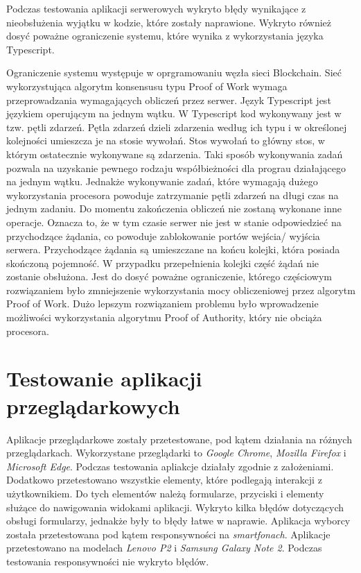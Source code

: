 \documentclass[a4paper,12pt]{book}
\begin{document}
Podczas testowania aplikacji serwerowych wykryto błędy wynikające z nieobsłużenia wyjątku w kodzie, które zostały naprawione. Wykryto również dosyć poważne ograniczenie systemu, które wynika z wykorzystania języka Typescript.

Ograniczenie systemu występuje w oprgramowaniu węzła sieci Blockchain. Sieć wykorzystująca algorytm konsensusu typu Proof of Work wymaga przeprowadzania wymagających obliczeń przez serwer. Język Typescript jest językiem operującym na jednym wątku. W Typescript kod wykonywany jest w tzw. pętli zdarzeń. Pętla zdarzeń dzieli zdarzenia według ich typu i w określonej kolejności umieszcza je na stosie wywołań. Stos wywołań to główny stos, w którym ostatecznie wykonywane są zdarzenia. Taki sposób wykonywania zadań pozwala na uzyskanie pewnego rodzaju współbieżności dla prograu działającego na jednym wątku. Jednakże wykonywanie zadań, które wymagają dużego wykorzystania procesora powoduje zatrzymanie pętli zdarzeń na długi czas na jednym zadaniu. Do momentu zakończenia obliczeń nie zostaną wykonane inne operacje. Oznacza to, że w tym czasie serwer nie jest w stanie odpowiedzieć na przychodzące żądania, co powoduje zablokowanie portów wejścia/ wyjścia serwera. Przychodzące żądania są umieszczane na końcu kolejki, która posiada skończoną pojemność. W przypadku przepełnienia kolejki część żądań nie zostanie obsłużona. Jest do dosyć poważne ograniczenie, którego częściowym rozwiązaniem było zmniejszenie wykorzystania mocy obliczeniowej przez algorytm Proof of Work. Dużo lepszym rozwiązaniem problemu było wprowadzenie możliwości wykorzystania algorytmu Proof of Authority, który nie obciąża procesora.

\section{Testowanie aplikacji przeglądarkowych}

Aplikacje przeglądarkowe zostały przetestowane, pod kątem działania na różnych przeglądarkach. Wykorzystane przeglądarki to \textit{Google Chrome}, \textit{Mozilla Firefox} i \textit{Microsoft Edge}. Podczas testowania apliakcje działały zgodnie z założeniami. Dodatkowo przetestowano wszystkie elementy, które podlegają interakcji z użytkownikiem. Do tych elementów należą formularze, przyciski i elementy służące do nawigowania widokami aplikacji. Wykryto kilka błędów dotyczących obsługi formularzy, jednakże były to błędy łatwe w naprawie.
Aplikacja wyborcy została przetestowana pod kątem responsywności na \textit{smartfonach}. Aplikacje przetestowano na modelach \textit{Lenovo P2} i \textit{Samsung Galaxy Note 2}. Podczas testowania responsywności nie wykryto błędów.
\end{document}
